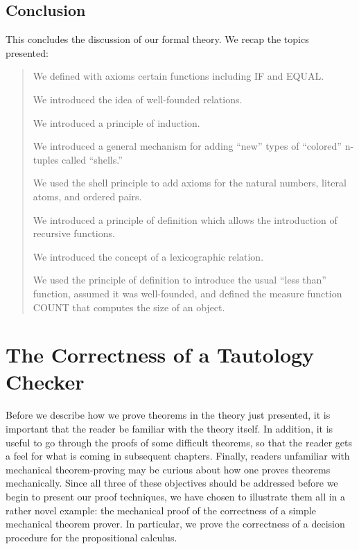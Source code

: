 \documentclass[11pt]{book}
\newenvironment{pubcrown}{\begin{quote}}{\end{quote}}
\newcommand{\pubdefaulttextsize}{\large}
\begin{document}
\section{Conclusion}
\pubdefaulttextsize
This concludes the discussion of our formal theory.
We recap the topics presented:
\begin{pubcrown}
We defined with axioms certain functions including IF and EQUAL.

We introduced the idea of well-founded relations.

We introduced a principle of induction.

We introduced a general mechanism for adding ``new'' types of
``colored'' n-tuples called ``shells.''

We  used the
shell principle to add axioms for the natural numbers,
literal atoms, and ordered pairs.

We introduced a principle of definition
which allows the introduction of recursive functions.

We introduced the concept of a lexicographic relation.

We used the principle of definition
to introduce the usual ``less than'' function, assumed it was well-founded,
and defined the measure function COUNT that computes the size of an object.
\end{pubcrown}
\chapter{The Correctness of a Tautology Checker}
\label{SECTAUTOLOGYCHECKER}
\pubdefaulttextsize
Before we describe how we prove theorems in the theory
just presented, it is important that the reader be familiar
with the theory itself.  In addition, it is useful to go through the proofs of
some difficult theorems, so that the reader gets a feel for what is
coming in subsequent chapters.  Finally, readers unfamiliar
with mechanical theorem-proving may be curious about how one 
proves theorems mechanically.
Since all three of these objectives should be
addressed before we begin to present our proof techniques, we have
chosen to illustrate them all in a rather novel example:
the mechanical proof of the correctness of
a simple mechanical theorem prover.  In particular, we prove the
correctness of a decision procedure for the propositional calculus.
\end{document}
